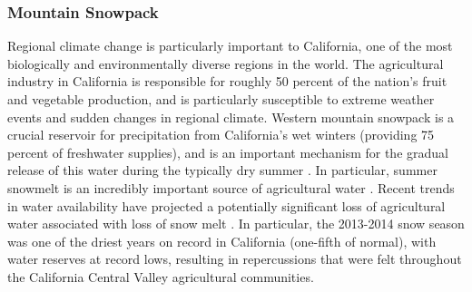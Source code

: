 \documentclass[11pt]{article}
\begin{document}
\subsubsection{Mountain Snowpack}
Regional climate change is particularly important to California, one of the most biologically and environmentally diverse regions in the world. The agricultural industry in California is responsible for roughly 50 percent of the nation’s fruit and vegetable production, and is particularly susceptible to extreme weather events and sudden changes in regional climate. Western mountain snowpack is a crucial reservoir for precipitation from California’s wet winters (providing 75 percent of freshwater supplies), and is an important mechanism for the gradual release of this water during the typically dry summer \citep{cayan1996interannual}. In particular, summer snowmelt is an incredibly important source of agricultural water \citep{dettinger1995large, mote_declining_2005, maurer2007detection}. Recent trends in water availability have projected a potentially significant loss of agricultural water associated with loss of snow melt \citep{dyer2006spatial}. In particular, the 2013-2014 snow season was one of the driest years on record in California (one-fifth of normal), with water reserves at record lows, resulting in repercussions that were felt throughout the California Central Valley agricultural communities.
\end{document}
